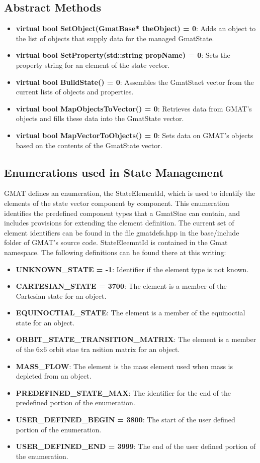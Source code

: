 \subsection{Abstract Methods}

\begin{itemize}
\item\textbf{virtual bool SetObject(GmatBase* theObject) = 0}:  Adds an object to the list of
objects that supply data for the managed GmatState.
\item\textbf{virtual bool SetProperty(std::string propName) = 0}:  Sets the property string for an
element of the state vector.
\item\textbf{virtual bool BuildState() = 0}:  Assembles the GmatStaet vector from the current lists
of objects and properties.
\item\textbf{virtual bool MapObjectsToVector() = 0}:  Retrieves data from GMAT's objects and fills
these data into the GmatState vector.
\item\textbf{virtual bool MapVectorToObjects() = 0}:  Sets data on GMAT's objects based on the
contents of the GmatState vector.
\end{itemize}

\subsection{Enumerations used in State Management}

GMAT defines an enumeration, the StateElementId, which is used to identify the elements of the
state vector component by component.  This enumeration identifies the predefined component types
that a GmatStae can contain, and includes provisions for extending the element definition.  The
current set of element identifiers can be found in the file gmatdefs.hpp in the base/include
folder of GMAT's source code.  StateEleemntId is contained in the Gmat namespace.  The following
definitions can be found there at this writing:

\begin{itemize}
\item\textbf{UNKNOWN\_STATE = -1}:  Identifier if the element type is not known.
\item\textbf{CARTESIAN\_STATE = 3700}: The element is a member of the Cartesian state for an object.
\item\textbf{EQUINOCTIAL\_STATE}: The element is a member of the equinoctial state for an object.
\item\textbf{ORBIT\_STATE\_TRANSITION\_MATRIX}: The element is a member of the 6x6 orbit stae tra
nsition matrix for an object.
\item\textbf{MASS\_FLOW}: The element is the mass element used when mass is depleted from an object.
\item\textbf{PREDEFINED\_STATE\_MAX}: The identifier for the end of the predefined portion of the
enumeration.
\item\textbf{USER\_DEFINED\_BEGIN = 3800}:  The start of the user defined portion of the
enumeration.
\item\textbf{USER\_DEFINED\_END = 3999}:  The end of the user defined portion of the enumeration.
\end{itemize}
